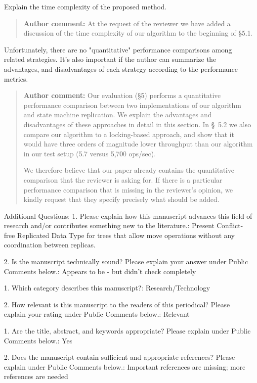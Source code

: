 \documentclass[10pt]{article}
\newcommand{\authorcomment}[1]{\begin{quote}\textbf{Author comment:} #1\end{quote}}
\begin{document}
\begin{spverbatim}
Explain the time complexity of the proposed method.
\end{spverbatim}
\authorcomment{At the request of the reviewer we have added a discussion of the time complexity of our algorithm to the beginning of {\S}5.1.}
\begin{spverbatim}
Unfortunately, there are no "quantitative" performance comparisons among related strategies. It’s also important if the author can summarize the advantages, and disadvantages of each strategy according to the performance metrics.
\end{spverbatim}
\authorcomment{Our evaluation ({\S}5) performs a quantitative performance comparison between two implementations of our algorithm and state machine replication.
We explain the advantages and disadvantages of these approaches in detail in this section.
In \S~5.2 we also compare our algorithm to a locking-based approach, and show that it would have three orders of magnitude lower throughput than our algorithm in our test setup (5.7 versus 5,700 ops/sec).

We therefore believe that our paper already contains the quantitative comparison that the reviewer is asking for.
If there is a particular performance comparison that is missing in the reviewer's opinion, we kindly request that they specify precisely what should be added.}
\begin{spverbatim}

Additional Questions:
1.  Please explain how this manuscript advances this field of research and/or contributes something new to the literature.: Present Conflict-free Replicated Data Type for trees that allow move operations without any coordination between replicas.

2. Is the manuscript technically sound? Please explain your answer under Public Comments below.: Appears to be - but didn't check completely

1. Which category describes this manuscript?: Research/Technology

2. How relevant is this manuscript to the readers of this periodical? Please explain your rating under Public Comments below.: Relevant

1. Are the title, abstract, and keywords appropriate? Please explain under Public Comments below.: Yes

2. Does the manuscript contain sufficient and appropriate references? Please explain under Public Comments below.: Important references are missing; more references are needed
\end{spverbatim}
\end{document}
